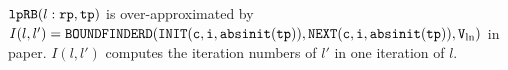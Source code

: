 \begin{enumerate}
        ${\mathtt{lpRB}}(l:{\mathtt{rp}}, {\mathtt{tp}})$ is over-approximated by
        $I(l, l') = {\mathtt{BOUNDFINDERD(INIT(c, i, {\mathtt{abs}}{{\mathtt{init}}}({\mathtt{tp}})), NEXT(c, i, {\mathtt{abs}}{{\mathtt{init}}}({\mathtt{tp}})), V_{\ln})}}$ in paper\cite{GulwaniJK09}.
        $I(l, l')$ computes the iteration numbers of $l'$ in one iteration of $l$.
\end{enumerate}